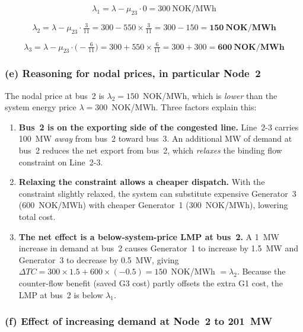 \[
  \lambda_1 = \lambda - \mu_{23} \cdot 0 = 300~\text{NOK/MWh}
\]

\[
  \lambda_2 = \lambda - \mu_{23} \cdot \tfrac{3}{11}
            = 300 - 550 \times \tfrac{3}{11}
            = 300 - 150
            = \mathbf{150~\text{NOK/MWh}}
\]

\[
  \lambda_3 = \lambda - \mu_{23} \cdot \bigl(-\tfrac{6}{11}\bigr)
            = 300 + 550 \times \tfrac{6}{11}
            = 300 + 300
            = \mathbf{600~\text{NOK/MWh}}
\]

\subsubsection*{(e) Reasoning for nodal prices, in particular Node~2}

The nodal price at bus~2 is $\lambda_2 = 150$~NOK/MWh, which is \emph{lower}
than the system energy price $\lambda = 300$~NOK/MWh.  Three factors explain
this:

\begin{enumerate}
  \item \textbf{Bus~2 is on the exporting side of the congested line.}
        Line~2-3 carries 100~MW \emph{away} from bus~2 toward bus~3.  An
        additional MW of demand at bus~2 reduces the net export from bus~2,
        which \emph{relaxes} the binding flow constraint on Line~2-3.

  \item \textbf{Relaxing the constraint allows a cheaper dispatch.}
        With the constraint slightly relaxed, the system can substitute
        expensive Generator~3 (600~NOK/MWh) with cheaper Generator~1
        (300~NOK/MWh), lowering total cost.

  \item \textbf{The net effect is a below-system-price LMP at bus~2.}
        A 1~MW increase in demand at bus~2 causes Generator~1 to increase
        by 1.5~MW and Generator~3 to decrease by 0.5~MW, giving
        $\Delta TC = 300\times1.5 + 600\times(-0.5) = 150$~NOK/MWh $= \lambda_2$.
        Because the counter-flow benefit (saved G3 cost) partly offsets the
        extra G1 cost, the LMP at bus~2 is below $\lambda_1$.
\end{enumerate}

\subsubsection*{(f) Effect of increasing demand at Node~2 to 201~MW}

